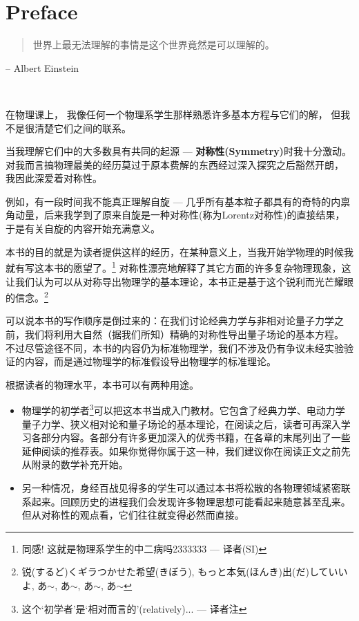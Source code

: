 
\chapter*{Preface}

\begin{quote}
世界上最无法理解的事情是这个世界竟然是可以理解的。
\end{quote}
\begin{flushright}
-- Albert Einstein
\end{flushright}


\ 

在物理课上， 我像任何一个物理系学生那样熟悉许多基本方程与它们的解， 但我不是很清楚它们之间的联系。

当我理解它们中的大多数具有共同的起源 --- \textbf{对称性(Symmetry)}时我十分激动。 对我而言搞物理最美的经历莫过于原本费解的东西经过深入探究之后豁然开朗， 我因此深爱着对称性。

例如，有一段时间我不能真正理解自旋 --- 几乎所有基本粒子都具有的奇特的内禀角动量，后来我学到了原来自旋是一种对称性(称为Lorentz对称性)的直接结果，于是有关自旋的内容开始充满意义。

本书的目的就是为读者提供这样的经历，在某种意义上，当我开始学物理的时候我就有写这本书的愿望了。\footnote{同感! 这就是物理系学生的中二病吗2333333 --- 译者(SI)} 对称性漂亮地解释了其它方面的许多复杂物理现象，这让我们认为可以从对称导出物理学的基本理论，本书正是基于这个锐利而光芒耀眼的信念。\footnote{锐(するど)くギラつかせた希望(きぼう), もっと本気(ほんき)出(だ)していいよ, あ$\sim$, あ$\sim$, あ$\sim$, あ$\sim$}

可以说本书的写作顺序是倒过来的：在我们讨论经典力学与非相对论量子力学之前，我们将利用大自然（据我们所知）精确的对称性导出量子场论的基本方程。 不过尽管途径不同，本书的内容仍为标准物理学，我们不涉及仍有争议未经实验验证的内容，而是通过物理学的标准假设导出物理学的标准理论。

根据读者的物理水平，本书可以有两种用途。
\begin{itemize}
	\item 物理学的初学者\footnote{这个`初学者'是`相对而言的'(relatively)... --- 译者注}可以把这本书当成入门教材。它包含了经典力学、电动力学量子力学、狭义相对论和量子场论的基本理论，在阅读之后，读者可再深入学习各部分内容。各部分有许多更加深入的优秀书籍，在各章的末尾列出了一些延伸阅读的推荐表。如果你觉得你属于这一种，我们建议你在阅读正文之前先从附录的数学补充开始。
	\item 
	另一种情况，身经百战见得多的学生可以通过本书将松散的各物理领域紧密联系起来。回顾历史的进程我们会发现许多物理思想可能看起来随意甚至乱来。但从对称性的观点看，它们往往就变得必然而直接。
\end{itemize}

